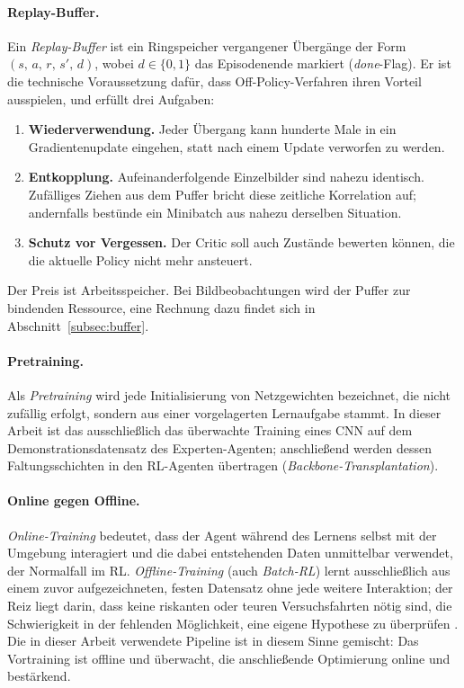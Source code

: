\paragraph{Replay-Buffer.}
Ein \emph{Replay-Buffer} ist ein Ringspeicher vergangener Übergänge der Form $(s,\,a,\,r,\,s',\,d)$, wobei $d \in \{0,1\}$ das Episodenende markiert (\emph{done}-Flag). Er ist die technische Voraussetzung dafür, dass Off-Policy-Verfahren ihren Vorteil ausspielen, und erfüllt drei Aufgaben:
\begin{enumerate}
  \item \textbf{Wiederverwendung.} Jeder Übergang kann hunderte Male in ein Gradientenupdate eingehen, statt nach einem Update verworfen zu werden.
  \item \textbf{Entkopplung.} Aufeinanderfolgende Einzelbilder sind nahezu identisch. Zufälliges Ziehen aus dem Puffer bricht diese zeitliche Korrelation auf; andernfalls bestünde ein Minibatch aus nahezu derselben Situation.
  \item \textbf{Schutz vor Vergessen.} Der Critic soll auch Zustände bewerten können, die die aktuelle Policy nicht mehr ansteuert.
\end{enumerate}
Der Preis ist Arbeitsspeicher. Bei Bildbeobachtungen wird der Puffer zur bindenden Ressource, eine Rechnung dazu findet sich in Abschnitt~\ref{subsec:buffer}.

\paragraph{Pretraining.}
Als \emph{Pretraining} wird jede Initialisierung von Netzgewichten bezeichnet, die nicht zufällig erfolgt, sondern aus einer vorgelagerten Lernaufgabe stammt. In dieser Arbeit ist das ausschließlich das überwachte Training eines \ac{CNN} auf dem Demonstrationsdatensatz des Experten-Agenten; anschließend werden dessen Faltungsschichten in den \ac{RL}-Agenten übertragen (\emph{Backbone-Transplantation}).

\paragraph{Online gegen Offline.}
\emph{Online-Training} bedeutet, dass der Agent während des Lernens selbst mit der Umgebung interagiert und die dabei entstehenden Daten unmittelbar verwendet, der Normalfall im \ac{RL}. \emph{Offline-Training} (auch \emph{Batch-RL}) lernt ausschließlich aus einem zuvor aufgezeichneten, festen Datensatz ohne jede weitere Interaktion; der Reiz liegt darin, dass keine riskanten oder teuren Versuchsfahrten nötig sind, die Schwierigkeit in der fehlenden Möglichkeit, eine eigene Hypothese zu überprüfen \cite{fang2022offline}. Die in dieser Arbeit verwendete Pipeline ist in diesem Sinne gemischt: Das Vortraining ist offline und überwacht, die anschließende Optimierung online und bestärkend.

